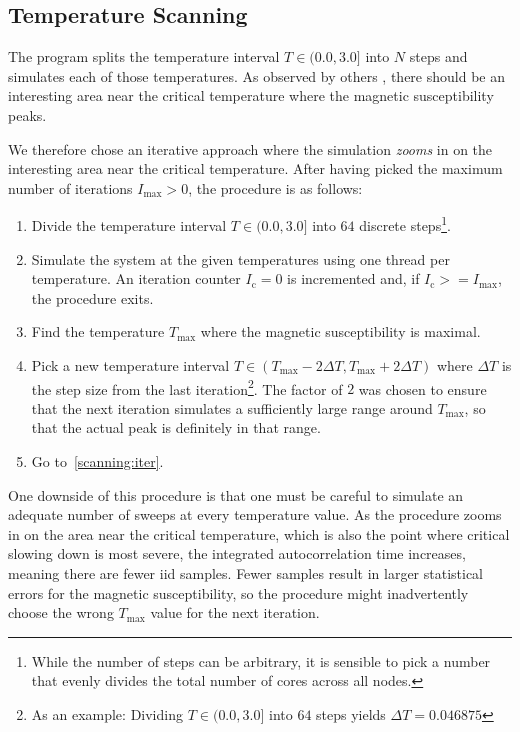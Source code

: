 \subsection{Temperature Scanning}\label{sec:impl:scanning}
	The program splits the temperature interval $T \in (0.0, 3.0]$ into $N$ steps and simulates each of those temperatures.  As observed by others \citep*{olsson_helicity}, there should be an interesting area near the critical temperature where the magnetic susceptibility peaks.
	
	We therefore chose an iterative approach where the simulation \emph{zooms} in on the interesting area near the critical temperature. After having picked the maximum number of iterations $I_\text{max} > 0$, the procedure is as follows:
	\begin{enumerate}
		\item \label{scanning:init} Divide the temperature interval $T \in (0.0, 3.0]$ into $64$ discrete steps\footnote{While the number of steps can be arbitrary, it is sensible to pick a number that evenly divides the total number of cores across all nodes.}.
		\item \label{scanning:iter} Simulate the system at the given temperatures using one thread per temperature. An iteration counter $I_\text{c} = 0$ is incremented and, if $I_\text{c} >= I_\text{max}$, the procedure exits.
		\item Find the temperature $T_\text{max}$ where the magnetic susceptibility is maximal.
		\item Pick a new temperature interval $T \in (T_\text{max} - 2 \Delta T,  T_\text{max} + 2 \Delta T)$ where $\Delta T$ is the step size from the last iteration\footnote{As an example: Dividing $T \in (0.0, 3.0]$ into $64$ steps yields $\Delta T = \num{0.046875}$}. The factor of $2$ was chosen to ensure that the next iteration simulates a sufficiently large range around $T_\text{max}$, so that the actual peak is definitely in that range.
		\item Go to~\cref{scanning:iter}.
	\end{enumerate}
	One downside of this procedure is that one must be careful to simulate an adequate number of sweeps at every temperature value. As the procedure zooms in on the area near the critical temperature, which is also the point where critical slowing down is most severe, the integrated autocorrelation time increases, meaning there are fewer iid samples. Fewer samples result in larger statistical errors for the magnetic susceptibility, so the procedure might inadvertently choose the wrong $T_\text{max}$ value for the next iteration.